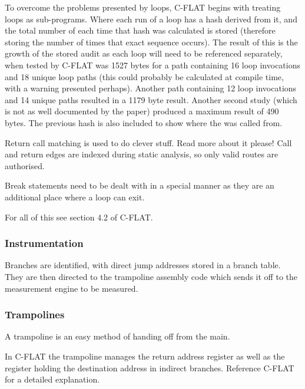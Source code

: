 To overcome the problems presented by loops, C-FLAT \cite{Abera2016} begins with treating loops as sub-programs. Where each run of a loop has a hash derived from it, and the total number of each time that hash was calculated is stored (therefore storing the number of times that exact sequence occurs). The result of this is the growth of the stored audit as each loop will need to be referenced separately, when tested by C-FLAT was 1527 bytes for a path containing 16 loop invocations and 18 unique loop paths (this could probably be calculated at compile time, with a warning presented perhaps). Another path containing 12 loop invocations and 14 unique paths resulted in a 1179 byte result. Another second study (which is not as well documented by the paper) produced a maximum result of 490 bytes. The previous hash is also included to show where the was called from. 

Return call matching is used to do clever stuff. Read more about it please! Call and return edges are indexed during static analysis, so only valid routes are authorised.

Break statements need to be dealt with in a special manner as they are an additional place where a loop can exit. 

For all of this see section 4.2 of C-FLAT.

\subsubsection{Instrumentation}

Branches are identified, with direct jump addresses stored in a branch table. They are then directed to the trampoline assembly code which sends it off to the measurement engine to be measured.

\subsubsection{Trampolines}

A trampoline is an easy method of handing off from the main.

In C-FLAT \cite{Abera2016} the trampoline manages the return address register as well as the register holding the destination address in indirect branches. Reference C-FLAT for a detailed explanation. 